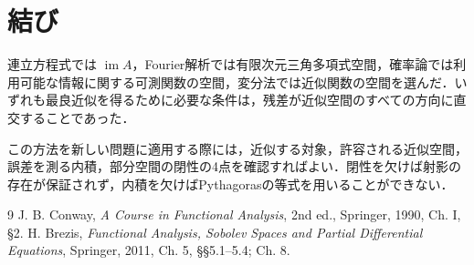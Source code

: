 \documentclass[a5paper,10pt,onecolumn]{jsarticle}
\theoremstyle{mathnotetheorem}
\begin{document}
\section{結び}
連立方程式では $\operatorname{im} A$，Fourier解析では有限次元三角多項式空間，確率論では利用可能な情報に関する可測関数の空間，変分法では近似関数の空間を選んだ．いずれも最良近似を得るために必要な条件は，残差が近似空間のすべての方向に直交することであった．

この方法を新しい問題に適用する際には，近似する対象，許容される近似空間，誤差を測る内積，部分空間の閉性の4点を確認すればよい．閉性を欠けば射影の存在が保証されず，内積を欠けばPythagorasの等式を用いることができない．

\begin{thebibliography}{9}
 J. B. Conway, \textit{A Course in Functional Analysis}, 2nd ed., Springer, 1990, Ch. I, \S2.
 H. Brezis, \textit{Functional Analysis, Sobolev Spaces and Partial Differential Equations}, Springer, 2011, Ch. 5, \S\S5.1--5.4; Ch. 8.
\end{thebibliography}
\end{document}
